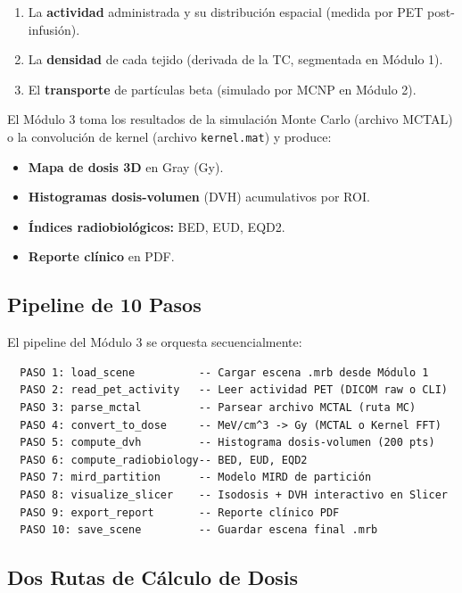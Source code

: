 \documentclass[12pt,a4paper]{article}
\begin{document}
\begin{enumerate}
  \item La \textbf{actividad} administrada y su distribución espacial (medida por PET post-infusión).
  \item La \textbf{densidad} de cada tejido (derivada de la TC, segmentada en Módulo 1).
  \item El \textbf{transporte} de partículas beta (simulado por MCNP en Módulo 2).
\end{enumerate}

El Módulo 3 toma los resultados de la simulación Monte Carlo (archivo MCTAL) o la convolución de kernel (archivo \texttt{kernel.mat}) y produce:

\begin{itemize}
  \item \textbf{Mapa de dosis 3D} en Gray (Gy).
  \item \textbf{Histogramas dosis-volumen} (DVH) acumulativos por ROI.
  \item \textbf{Índices radiobiológicos:} BED, EUD, EQD2.
  \item \textbf{Reporte clínico} en PDF.
\end{itemize}

\subsection{Pipeline de 10 Pasos}

El pipeline del Módulo 3 se orquesta secuencialmente:

\begin{verbatim}
  PASO 1: load_scene          -- Cargar escena .mrb desde Módulo 1
  PASO 2: read_pet_activity   -- Leer actividad PET (DICOM raw o CLI)
  PASO 3: parse_mctal         -- Parsear archivo MCTAL (ruta MC)
  PASO 4: convert_to_dose     -- MeV/cm^3 -> Gy (MCTAL o Kernel FFT)
  PASO 5: compute_dvh         -- Histograma dosis-volumen (200 pts)
  PASO 6: compute_radiobiology-- BED, EUD, EQD2
  PASO 7: mird_partition      -- Modelo MIRD de partición
  PASO 8: visualize_slicer    -- Isodosis + DVH interactivo en Slicer
  PASO 9: export_report       -- Reporte clínico PDF
  PASO 10: save_scene         -- Guardar escena final .mrb
\end{verbatim}

\subsection{Dos Rutas de Cálculo de Dosis}
\end{document}
